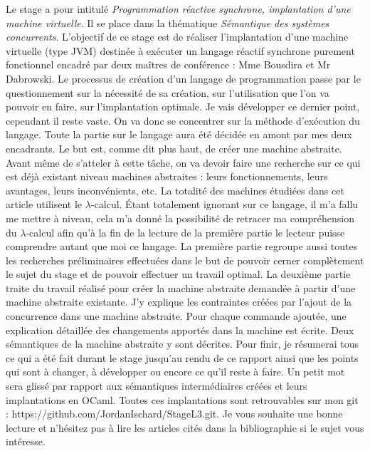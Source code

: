 \documentclass[10pt,a4paper]{report}
\begin{document}
Le stage a pour intitulé \textit{Programmation réactive synchrone, implantation d’une machine virtuelle}. Il se place dans la thématique
\textit{Sémantique des systèmes concurrents}. L’objectif de ce stage est de réaliser l’implantation d’une machine virtuelle (type JVM) destinée
à exécuter un langage réactif synchrone purement fonctionnel encadré par deux maîtres de conférence : Mme Bousdira et Mr Dabrowski.
\smallbreak
Le processus de création d'un langage de programmation passe par le questionnement sur la nécessité de sa création, sur l'utilisation que
l'on va pouvoir en faire, sur l'implantation optimale. Je vais développer ce dernier point, cependant il reste vaste. On va donc se concentrer
sur la méthode d'exécution du langage. Toute la partie sur le langage aura été décidée en amont par mes deux encadrants.
\smallbreak
Le but est, comme dit plus haut, de créer une machine abstraite. Avant même de s'atteler à cette tâche, on va devoir faire une recherche sur ce
qui est déjà existant niveau machines abstraites : leurs fonctionnements, leurs avantages, leurs inconvénients, etc. La totalité des machines étudiées
dans cet article utilisent le $\lambda$-calcul. Étant totalement ignorant sur ce langage, il m'a fallu me mettre à niveau, cela m'a donné la
possibilité de retracer ma compréhension du $\lambda$-calcul afin qu'à la fin de la lecture de la première partie le lecteur puisse comprendre autant
que moi ce langage. La première partie regroupe aussi toutes les recherches préliminaires effectuées dans le but de pouvoir cerner complètement le sujet
du stage et de pouvoir effectuer un travail optimal.
\smallbreak
La deuxième partie traite du travail réalisé pour créer la machine abstraite demandée à partir d'une machine abstraite existante. J'y explique les contraintes créées par l'ajout de la concurrence dans une machine abstraite. Pour chaque commande ajoutée, une explication détaillée des changements apportés dans la machine est écrite. Deux sémantiques de la machine abstraite y sont décrites.
\smallbreak
Pour finir, je résumerai tous ce qui a été fait durant le stage jusqu'au rendu de ce rapport ainsi que les points qui sont à changer, à développer ou encore ce qu'il reste à faire. Un petit mot sera glissé par rapport aux sémantiques intermédiaires créées et leurs implantations en OCaml. Toutes ces implantations sont retrouvables sur mon git : https://github.com/JordanIschard/StageL3.git.
\smallbreak
Je vous souhaite une bonne lecture et n'hésitez pas à lire les articles cités dans la bibliographie si le sujet vous intéresse.
\newpage
\end{document}
